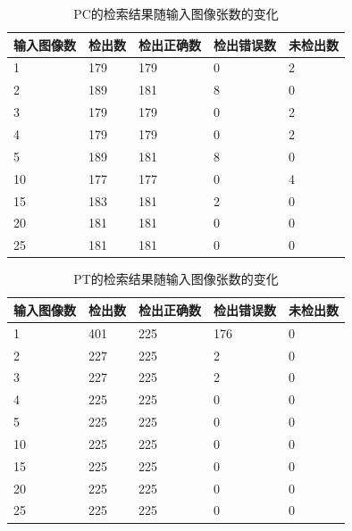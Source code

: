 \begin{table}
	\centering
	\begin{tabular}{C{2.5cm}|C{2cm}|C{2.5cm}|C{2.5cm}|C{2.0cm}}
		\hline
		输入图像数 & 检出数 & 检出正确数 & 检出错误数 & 未检出数 \\ \hline
		\hspace{0.4em}1 & 179 & 179 & 0 & 2\\ %
		\hspace{0.4em}2 & 189 & 181 & 8 & 0\\ %
		\hspace{0.4em}3 & 179 & 179 & 0 & 2\\ %
		\hspace{0.4em}4 & 179 & 179 & 0 & 2\\ %
		\hspace{0.4em}5 & 189 & 181 & 8 & 0\\ %
		10 & 177 & 177 & 0 & 4\\ %
		15 & 183 & 181 & 2 & 0\\ %
		20 & 181 & 181 & 0 & 0\\ %
		25 & 181 & 181 & 0 & 0\\ \hline
	\end{tabular}
	\caption{PC的检索结果随输入图像张数的变化}
	\label{tab:PC}
\end{table}

\begin{table}[H]
	\centering
	\begin{tabular}{C{2.5cm}|C{2cm}|C{2.5cm}|C{2.5cm}|C{2.0cm}}
		\hline
		输入图像数 & 检出数 & 检出正确数 & 检出错误数 & 未检出数 \\ \hline
		\hspace{0.4em} 1 & 401 & 225 & 176 & 0\\ %
		\hspace{0.4em} 2 & 227 & 225 & 2 & 0\\ %
		\hspace{0.4em} 3 & 227 & 225 & 2 & 0\\ %
		\hspace{0.4em} 4 & 225 & 225 & 0 & 0\\ %
		\hspace{0.4em} 5 & 225 & 225 & 0 & 0\\ %
		10 & 225 & 225 & 0 & 0\\ %
		15 & 225 & 225 & 0 & 0\\ %
		20 & 225 & 225 & 0 & 0\\ %
		25 & 225 & 225 & 0 & 0\\ \hline
	\end{tabular}
	\caption{PT的检索结果随输入图像张数的变化}
	\label{tab:PT}
\end{table}


